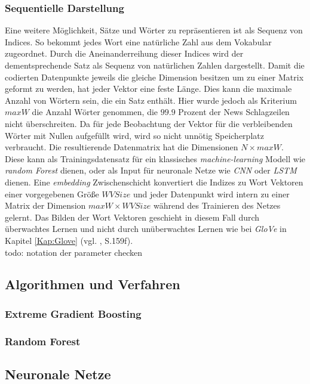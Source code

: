 \documentclass[a4paper,11pt]{article}
\begin{document}
\subsubsection{Sequentielle Darstellung} \label{Kap:Seq}

Eine weitere Möglichkeit, Sätze und Wörter zu repräsentieren ist als Sequenz von Indices. So bekommt jedes Wort eine natürliche Zahl aus dem Vokabular zugeordnet. Durch die Aneinanderreihung dieser Indices wird der dementsprechende Satz als Sequenz von natürlichen Zahlen dargestellt. Damit die codierten Datenpunkte jeweils die gleiche Dimension besitzen um zu einer Matrix geformt zu werden, hat jeder Vektor eine feste Länge. Dies kann die maximale Anzahl von Wörtern sein, die ein Satz enthält. Hier wurde jedoch als Kriterium $maxW$ die Anzahl Wörter genommen, die $99.9$ Prozent der News Schlagzeilen nicht überschreiten.
Da für jede Beobachtung der Vektor für die verbleibenden Wörter mit Nullen aufgefüllt wird, wird so nicht unnötig Speicherplatz verbraucht. Die resultierende Datenmatrix hat die Dimensionen $N \times maxW$. Diese kann als Trainingsdatensatz für ein klassisches \textit{machine-learning} Modell wie \textit{random Forest} dienen, oder als Input für neuronale Netze wie \textit{CNN} oder \textit{LSTM} dienen. Eine \textit{embedding} Zwischenschicht konvertiert die Indizes zu Wort Vektoren einer vorgegebenen Größe $WVSize$ und jeder Datenpunkt wird intern zu einer Matrix der Dimension $maxW \times WVSize$ während des Trainieren des Netzes gelernt. Das Bilden der Wort Vektoren geschieht in diesem Fall durch überwachtes Lernen und nicht durch unüberwachtes Lernen wie bei \textit{GloVe} in Kapitel \ref{Kap:Glove} (vgl. \cite{keras}, S.159f).\\

todo: notation der parameter checken


\subsection{Algorithmen und Verfahren}

\subsubsection{Extreme Gradient Boosting}
\subsubsection{Random Forest}

\subsection{Neuronale Netze}
\end{document}
